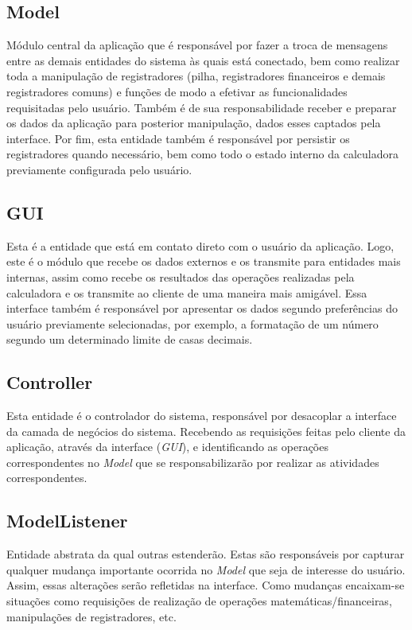 \subsection{Model}
Módulo central da aplicação que é responsável por fazer a troca de mensagens entre as demais entidades do sistema às quais está conectado, bem como realizar toda a manipulação de registradores (pilha, registradores financeiros e demais registradores comuns) e funções de modo a efetivar as funcionalidades requisitadas pelo usuário. Também é de sua responsabilidade receber e preparar os dados da aplicação para posterior manipulação, dados esses captados pela interface. Por fim, esta entidade também é responsável por persistir os re\-gistradores quando necessário, bem como todo o estado interno da calculadora previamente configurada pelo usuário.

\subsection{GUI}
Esta é a entidade que está em contato direto com o usuário da aplicação. Logo, este é o módulo que recebe os dados externos e os transmite para entidades mais internas, assim como recebe os resultados das operações realizadas pela calculadora e os transmite ao cliente de uma maneira mais amigável. Essa interface também é responsável por apresentar os dados segundo preferências do usuário previamente selecionadas, por exemplo, a formatação de um número segundo um determinado limite de casas decimais.

\subsection{Controller}
Esta entidade é o controlador do sistema, responsável por desacoplar a interface da camada de negócios do sistema. Recebendo as requisições feitas pelo cliente da aplicação, através da interface (\textit{GUI}), e identificando as operações correspondentes no \textit{Model} que se responsabilizarão por realizar as atividades correspondentes.

\subsection{ModelListener}
Entidade abstrata da qual outras estenderão. Estas são responsáveis por capturar qualquer mudança importante ocorrida no \textit{Model} que seja de interesse do usuário. Assim, essas alte\-rações serão refletidas na interface. Como mudanças encaixam-se situações como requisições de rea\-lização de operações matemáticas/financeiras, manipulações de registradores, etc.

